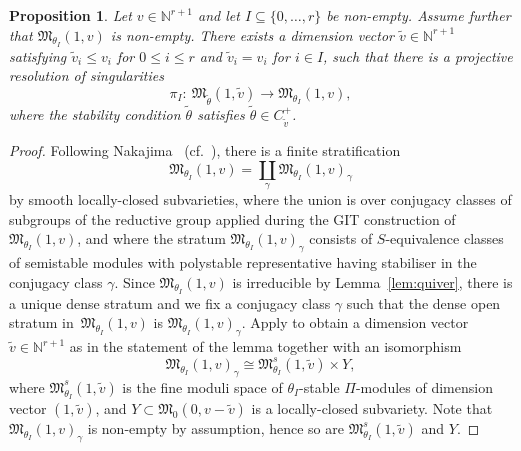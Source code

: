 \documentclass[pdftex]{sigma}%
\newtheorem{Proposition}[Theorem]{Proposition}
 { \theoremstyle{definition}
\newtheorem{Definition}[Theorem]{Definition}
\newtheorem{Example}[Theorem]{Example}
\newtheorem{Remark}[Theorem]{Remark}
\newtheorem{remarks}[theorem]{Remarks}
}
\numberwithin{equation}{section}
\begin{document}
\begin{Proposition}\label{prop:surjvar}
Let $v \in \mathbb{N}^{r+1}$ and let $ I \subseteq \{0, \dots , r\}$ be non-empty. Assume further that
$\mathfrak{M}_{\theta_I}(1,v)$ is non-empty.
There exists a dimension vector $\widetilde{v}\in \mathbb{N}^{r+1}$ satisfying $\widetilde{v}_i \leq v_i$ for $0 \leq i \leq r$ and $\widetilde{v}_i = v_i$ for $i \in I$,
such that there is a projective resolution of singularities
\[
\pi_{I}\colon \ \mathfrak{M}_{\widetilde{\theta}}(1,\widetilde{v})\to \mathfrak{M}_{\theta_I}(1,v),
\]
where the stability condition $\widetilde{\theta}$ satisfies $\widetilde\theta\in C_{\widetilde v}^+$.
\end{Proposition}
\begin{proof}
 Following Nakajima~\cite[Section 6]{nakajima1994instantons} (cf.\ \cite[Section 3.5]{bellamy2020birational}),
 there is a finite stratification
\begin{equation*}
\mathfrak{M}_{\theta_I}(1,v) = \coprod_{\gamma} \mathfrak{M}_{\theta_I}(1,v)_{\gamma} \end{equation*}
by smooth locally-closed subvarieties, where the union is over conjugacy classes of subgroups of the reductive group applied during the GIT construction of $\mathfrak{M}_{\theta_I}(1,v)$, and where the stratum $\mathfrak{M}_{\theta_I}(1,v)_{\gamma}$ consists of $S$-equivalence classes of semistable modules with polystable representative having stabiliser in the conjugacy class $\gamma$. Since $\mathfrak{M}_{\theta_I}(1,v)$ is irreducible by Lemma~\ref{lem:quiver}, there is a unique dense stratum and we fix a conjugacy class $\gamma$
 such that the dense open stratum in~$\mathfrak{M}_{\theta_I}(1,v)$ is $\mathfrak{M}_{\theta_I}(1,v)_\gamma$. Apply \cite[Proposition 2.25]{nakajima2009quiver} to obtain a dimension vector $\widetilde{v}\in \mathbb{N}^{r+1}$ as in the statement of the lemma
 together with an isomorphism
\begin{equation} \label{eqn:gammaIsom}
\mathfrak{M}_{\theta_I}(1,v)_{\gamma} \cong \mathfrak{M}^s_{\theta_I}(1,\widetilde{v}) \times {Y},
\end{equation}
 where $\mathfrak{M}^s_{\theta_I}(1,\widetilde{v})$ is the fine moduli space of $\theta_I$-stable $\Pi$-modules of dimension vector $(1,\widetilde{v})$, and ${Y} \subset \mathfrak{M}_{0}(0,v-\widetilde{v})$ is a locally-closed subvariety.
 Note that $\mathfrak{M}_{\theta_I}(1,v)_{\gamma}$ is non-empty by assumption, hence so are $\mathfrak{M}^s_{\theta_I}(1,\widetilde{v})$ and ${Y}$.


\end{proof}
\end{document}

